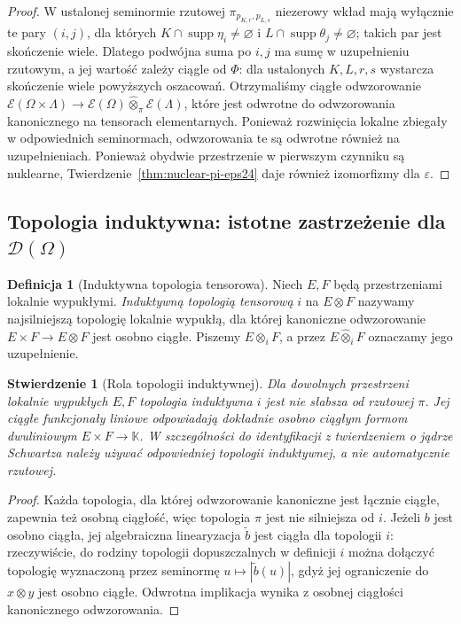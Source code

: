 \documentclass[11pt,a4paper]{article}
\numberwithin{equation}{section}
\theoremstyle{plain}
\newtheorem{stwierdzenie}[twierdzenie]{Stwierdzenie}
\theoremstyle{definition}
\newtheorem{definicja}[twierdzenie]{Definicja}
\theoremstyle{remark}
\newcommand{\K}{\mathbb K}
\DeclareMathOperator{\supp}{supp}
\begin{document}
\begin{proof}
W ustalonej seminormie rzutowej
$\pi_{p_{K,r},p_{L,s}}$ niezerowy wkład mają wyłącznie
te pary $(i,j)$, dla których $K\cap\supp\eta_i\ne\varnothing$
i $L\cap\supp\theta_j\ne\varnothing$; takich par
jest skończenie wiele. Dlatego podwójna suma po $i,j$
ma sumę w uzupełnieniu rzutowym, a jej wartość
zależy ciągle od $\Phi$: dla ustalonych $K,L,r,s$
wystarcza skończenie wiele powyższych oszacowań.
Otrzymaliśmy ciągłe odwzorowanie
$\mathcal E(\Omega\times\Lambda)\to
\mathcal E(\Omega)\widehat\otimes_\pi\mathcal E(\Lambda)$,
które jest odwrotne do odwzorowania kanonicznego na
tensorach elementarnych. Ponieważ rozwinięcia lokalne
zbiegały w odpowiednich seminormach, odwzorowania te są
odwrotne również na uzupełnieniach.
Ponieważ obydwie przestrzenie w pierwszym czynniku są
nuklearne, Twierdzenie~\ref{thm:nuclear-pi-eps24}
daje również izomorfizmy dla $\varepsilon$.
\end{proof}

\subsection{Topologia induktywna: istotne zastrzeżenie dla \texorpdfstring{$\mathcal D(\Omega)$}{D(Omega)}}

\begin{definicja}[Induktywna topologia tensorowa]
\label{def:i-topology24}
Niech $E,F$ będą przestrzeniami lokalnie wypukłymi.
\emph{Induktywną topologią tensorową} $i$ na $E\otimes F$
nazywamy najsilniejszą topologię lokalnie wypukłą,
dla której kanoniczne odwzorowanie
$E\times F\to E\otimes F$ jest osobno ciągłe.
Piszemy $E\otimes_i F$, a przez
$E\widehat\otimes_i F$ oznaczamy jego uzupełnienie.
\end{definicja}

\begin{stwierdzenie}[Rola topologii induktywnej]
\label{prop:i-vs-pi24}
Dla dowolnych przestrzeni lokalnie wypukłych $E,F$
topologia induktywna $i$ jest nie słabsza od rzutowej
$\pi$. Jej ciągłe funkcjonały liniowe odpowiadają
dokładnie osobno ciągłym formom dwuliniowym
$E\times F\to\K$. W szczególności do identyfikacji
z twierdzeniem o jądrze Schwartza należy używać
odpowiedniej topologii induktywnej, a nie automatycznie
rzutowej.
\end{stwierdzenie}
\begin{proof}
Każda topologia, dla której odwzorowanie kanoniczne
jest łącznie ciągłe, zapewnia też osobną ciągłość,
więc topologia $\pi$ jest nie silniejsza od $i$.
Jeżeli $b$ jest osobno ciągła, jej algebraiczna
linearyzacja $\widetilde b$ jest ciągła dla topologii $i$:
rzeczywiście, do rodziny topologii dopuszczalnych w definicji
$i$ można dołączyć topologię wyznaczoną przez seminormę
$u\mapsto|\widetilde b(u)|$, gdyż jej ograniczenie do
$x\otimes y$ jest osobno ciągłe. Odwrotna implikacja
wynika z osobnej ciągłości kanonicznego odwzorowania.
\end{proof}
\end{document}
